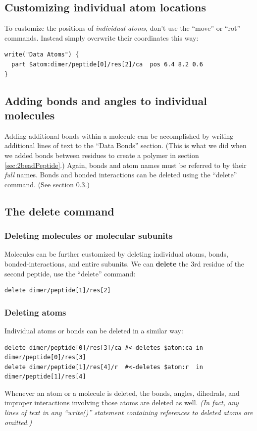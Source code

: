 \documentclass[11pt]{article}
\begin{document}
\subsection{Customizing individual atom locations}
\label{sec:custom_atom}
To customize the positions of \textit{individual atoms}, 
don't use the ``move'' or ``rot'' commands.
Instead simply overwrite their coordinates this way:
\begin{verbatim}
write("Data Atoms") {
  part $atom:dimer/peptide[0]/res[2]/ca  pos 6.4 8.2 0.6
}
\end{verbatim}

\subsection{Adding bonds and angles to individual molecules}
\label{sec:adding_atoms_bonds}
Adding additional bonds within a molecule can be accomplished
by writing additional lines of text to the ``Data Bonds'' section.
(This is what we did when we added bonds between residues to create a polymer
 in section \ref{sec:2beadPeptide}.)
Again, bonds and atom names must be referred to by their \textit{full} names.
Bonds and bonded interactions can be deleted using the ``delete'' command.
(See section \ref{sec:delete}.)


\subsection{The \textbf{delete} command}
\label{sec:delete}

\subsubsection{Deleting molecules or molecular subunits}
Molecules can be further customized by deleting 
individual atoms, bonds, bonded-interactions, and entire subunits.
We can \textbf{delete} the 3rd residue of the second peptide, 
use the ``delete'' command:
\begin{verbatim}
delete dimer/peptide[1]/res[2]
\end{verbatim}

\subsubsection{Deleting atoms}
\label{sec:delete_atoms_bonds}
Individual atoms or bonds can be deleted in a similar way:
\begin{verbatim}
delete dimer/peptide[0]/res[3]/ca #<-deletes $atom:ca in dimer/peptide[0]/res[3]
delete dimer/peptide[1]/res[4]/r  #<-deletes $atom:r  in dimer/peptide[1]/res[4]
\end{verbatim}
Whenever an atom or a molecule is deleted, the bonds, angles, dihedrals, 
and improper interactions involving those atoms are deleted as well.
\textit{(In fact, any lines of text in any ``write()'' statement 
containing references to deleted atoms are omitted.)}
\end{document}
